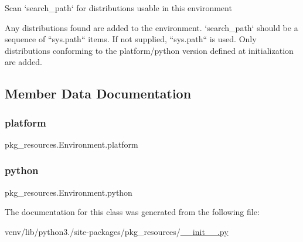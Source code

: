 \begin{DoxyVerb}Scan `search_path` for distributions usable in this environment

Any distributions found are added to the environment.
`search_path` should be a sequence of ``sys.path`` items.  If not
supplied, ``sys.path`` is used.  Only distributions conforming to
the platform/python version defined at initialization are added.
\end{DoxyVerb}
 

\subsection{Member Data Documentation}
\mbox{\label{classpkg__resources_1_1Environment_a8512772df91acc77fc4ea47e2d483e7a}} 
\subsubsection{\texorpdfstring{platform}{platform}}
{\footnotesize\ttfamily pkg\+\_\+resources.\+Environment.\+platform}

\mbox{\label{classpkg__resources_1_1Environment_a92643caa8139bba1bd63c32c22d1878c}} 
\subsubsection{\texorpdfstring{python}{python}}
{\footnotesize\ttfamily pkg\+\_\+resources.\+Environment.\+python}



The documentation for this class was generated from the following file\+:\begin{DoxyCompactItemize}
\item 
venv/lib/python3./site-\/packages/pkg\+\_\+resources/\hyperlink{venv_2lib_2python3_89_2site-packages_2pkg__resources_2____init_____8py}{\+\_\+\+\_\+init\+\_\+\+\_\+.\+py}\end{DoxyCompactItemize}
